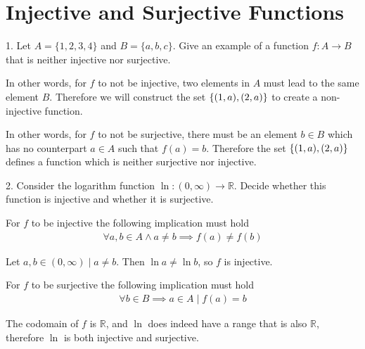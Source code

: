 \documentclass{article}
\begin{document}
\section{Injective and Surjective Functions}

\begin{exercise}{}{}
	{1. Let $A=\{1,2,3,4\}$ and $B=\{a, b, c\}$. Give an example of
		a function $f: A \rightarrow B$ that is neither injective nor surjective.}
	\begin{alist}
		\item In other words, for $f$ to not be injective, two elements in $A$ must lead
		to the same element $B$. Therefore we will construct the set $\{(1, a),
				(2, a)\}$ to create a non-injective function.
		\item In other words, for $f$ to not be surjective, there must be an element
		$b\in B$ which has no counterpart $a \in A$ such that $f(a) = b$. Therefore the set
		$\{(1, a), (2, a)\}$ defines a function which is neither surjective nor
		injective.
	\end{alist}
\end{exercise}{}{}

\begin{exercise}{}{}
	{2. Consider the logarithm function $\ln :(0, \infty)
			\rightarrow \mathbb{R}$. Decide whether this function is injective and
		whether it is surjective.}
	\begin{alist}
		\item For $f$ to be injective the following implication must hold
		\begin{align*}
			\forall a, b \in A \land a\neq b\implies f(a) \neq f(b)
		\end{align*}
		\item Let $a, b\in (0, \infty)\mid a\neq b$. Then $\ln a \neq \ln b$, so $f$ is
		injective.
		\item For $f$ to be surjective the following implication must hold
		\begin{align*}
			\forall b \in B \implies a \in A \mid f(a) = b
		\end{align*}
		\item The codomain of $f$ is $\mathbb{R}$, and $\ln$ does indeed have a range
		that is also $\mathbb{R}$, therefore $\ln$ is both injective and surjective.
	\end{alist}
\end{exercise}{}{}
\end{document}
